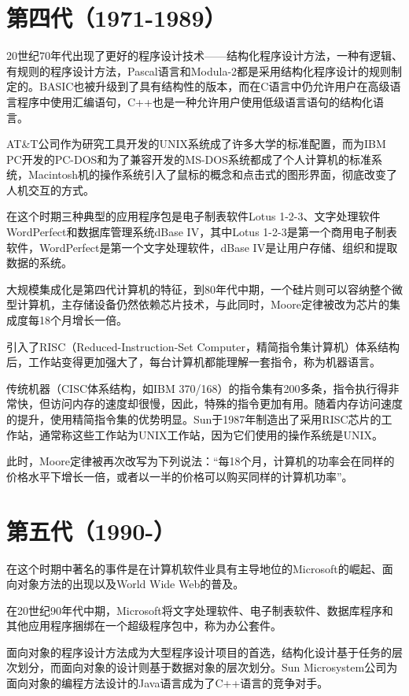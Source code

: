 \section{第四代（1971-1989）}

20世纪70年代出现了更好的程序设计技术——结构化程序设计方法，一种有逻辑、有规则的程序设计方法，Pascal语言和Modula-2都是采用结构化程序设计的规则制定的。BASIC也被升级到了具有结构性的版本，而在C语言中仍允许用户在高级语言程序中使用汇编语句，C++也是一种允许用户使用低级语言语句的结构化语言。

AT\&T公司作为研究工具开发的UNIX系统成了许多大学的标准配置，而为IBM PC开发的PC-DOS和为了兼容开发的MS-DOS系统都成了个人计算机的标准系统，Macintosh机的操作系统引入了鼠标的概念和点击式的图形界面，彻底改变了人机交互的方式。

在这个时期三种典型的应用程序包是电子制表软件Lotus 1-2-3、文字处理软件WordPerfect和数据库管理系统dBase IV，其中Lotus 1-2-3是第一个商用电子制表软件，WordPerfect是第一个文字处理软件，dBase IV是让用户存储、组织和提取数据的系统。

大规模集成化是第四代计算机的特征，到80年代中期，一个硅片则可以容纳整个微型计算机，主存储设备仍然依赖芯片技术，与此同时，Moore定律被改为芯片的集成度每18个月增长一倍。

引入了RISC（Reduced-Instruction-Set Computer，精简指令集计算机）体系结构后，工作站变得更加强大了，每台计算机都能理解一套指令，称为机器语言。

传统机器（CISC体系结构，如IBM 370/168）的指令集有200多条，指令执行得非常快，但访问内存的速度却很慢，因此，特殊的指令更加有用。随着内存访问速度的提升，使用精简指令集的优势明显。Sun于1987年制造出了采用RISC芯片的工作站，通常称这些工作站为UNIX工作站，因为它们使用的操作系统是UNIX。

此时，Moore定律被再次改写为下列说法：“每18个月，计算机的功率会在同样的价格水平下增长一倍，或者以一半的价格可以购买同样的计算机功率”。

\section{第五代（1990-）}

在这个时期中著名的事件是在计算机软件业具有主导地位的Microsoft的崛起、面向对象方法的出现以及World Wide Web的普及。

在20世纪90年代中期，Microsoft将文字处理软件、电子制表软件、数据库程序和其他应用程序捆绑在一个超级程序包中，称为办公套件。

面向对象的程序设计方法成为大型程序设计项目的首选，结构化设计基于任务的层次划分，而面向对象的设计则基于数据对象的层次划分。Sun Microsystem公司为面向对象的编程方法设计的Java语言成为了C++语言的竞争对手。

